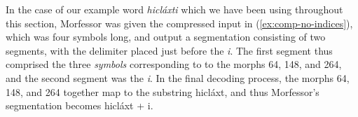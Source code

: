 In the case of our example word \textit{hicl\'{a}xti} which we have been using throughout this section, Morfessor was given the compressed input in (\ref{ex:comp-no-indices}), which was four symbols long, and output a segmentation consisting of two segments, with the delimiter placed just before the \textit{i}. The first segment thus comprised the three \emph{symbols} corresponding to to the morphs 64, 148, and 264, and the second segment was the \emph{i}. In the final decoding process, the morphs 64, 148, and 264 together map to the substring hicl\'axt, and thus Morfessor's segmentation becomes hicl\'axt + i.

%

